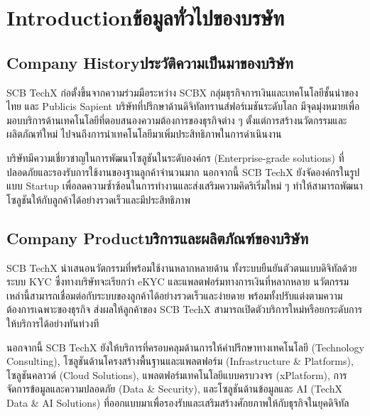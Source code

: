 \chapter{\ifenglish Introduction\else ข้อมูลทั่วไปของบรษัท\fi}

\section{\ifenglish Company History\else ประวัติความเป็นมาของบริษัท\fi}

SCB TechX \cite{techxWebsite} ก่อตั้งขึ้นจากความร่วมมือระหว่าง SCBX กลุ่มธุรกิจการเงินและเทคโนโลยีชั้นนำของไทย และ Publicis Sapient บริษัทที่ปรึกษาด้านดิจิทัลทรานส์ฟอร์เมชันระดับโลก มีจุดมุ่งหมายเพื่อมอบบริการด้านเทคโนโลยีที่ตอบสนองความต้องการของธุรกิจต่าง ๆ ตั้งแต่การสร้างนวัตกรรมและผลิตภัณฑ์ใหม่ ไปจนถึงการนำเทคโนโลยีมาเพิ่มประสิทธิภาพในการดำเนินงาน

บริษัทมีความเชี่ยวชาญในการพัฒนาโซลูชันในระดับองค์กร (Enterprise-grade solutions) ที่ปลอดภัยและรองรับการใช้งานของฐานลูกค้าจำนวนมาก นอกจากนี้ SCB TechX ยังจัดองค์กรในรูปแบบ Startup เพื่อลดความซ้ำซ้อนในการทำงานและส่งเสริมความคิดริเริ่มใหม่ ๆ ทำให้สามารถพัฒนาโซลูชันให้กับลูกค้าได้อย่างรวดเร็วและมีประสิทธิภาพ


\section{\ifenglish Company Product\else บริการและผลิตภัณฑ์ของบริษัท\fi}
SCB TechX นำเสนอนวัตกรรมที่พร้อมใช้งานหลากหลายด้าน \cite{techxProduct} ทั้งระบบยืนยันตัวตนแบบดิจิทัลด้วยระบบ KYC \cite{whatIsKYC} ซึ่งทางบริษัทจะเรียกว่า eKYC และแพลตฟอร์มทางการเงินที่หลากหลาย นวัตกรรมเหล่านี้สามารถเชื่อมต่อกับระบบของลูกค้าได้อย่างรวดเร็วและง่ายดาย พร้อมทั้งปรับแต่งตามความต้องการเฉพาะของธุรกิจ ส่งผลให้ลูกค้าของ SCB TechX สามารถเปิดตัวบริการใหม่หรือยกระดับการให้บริการได้อย่างทันท่วงที

นอกจากนี้ SCB TechX ยังให้บริการที่ครอบคลุมด้านการให้คำปรึกษาทางเทคโนโลยี (Technology Consulting), โซลูชันด้านโครงสร้างพื้นฐานและแพลตฟอร์ม (Infrastructure \& Platforms), โซลูชันคลาวด์ (Cloud Solutions), แพลตฟอร์มเทคโนโลยีแบบครบวงจร (xPlatform), การจัดการข้อมูลและความปลอดภัย (Data \& Security), และโซลูชันด้านข้อมูลและ AI (TechX Data \& AI Solutions) ที่ออกแบบมาเพื่อรองรับและเสริมสร้างศักยภาพให้กับธุรกิจในยุคดิจิทัล

\clearpage

